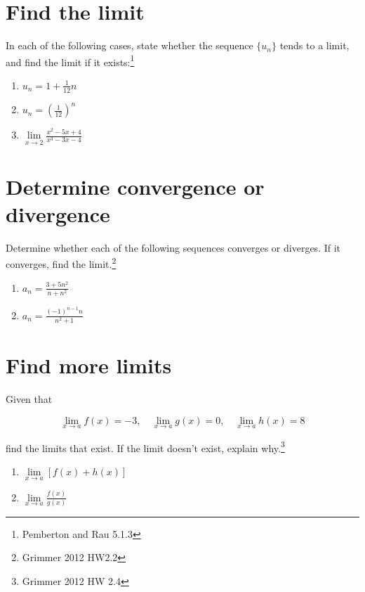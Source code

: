 \documentclass[
  letterpaper,
  DIV=11,
  numbers=noendperiod]{scrartcl}
\begin{document}
\hypertarget{find-the-limit}{%
\section{Find the limit}\label{find-the-limit}}

In each of the following cases, state whether the sequence \(\{ u_n \}\)
tends to a limit, and find the limit if it exists:\footnote{Pemberton
  and Rau 5.1.3}

\begin{enumerate}
\def\labelenumi{\alph{enumi}.}
\item
  \(u_n = 1 + \frac{1}{12} n\)
\item
  \(u_n = \left( \frac{1}{12} \right)^n\)
\item
  \(\underset{x \to 2}\lim \frac{x^2 - 5x + 4}{x^3 - 3x -4}\)
\end{enumerate}

\hypertarget{determine-convergence-or-divergence}{%
\section{Determine convergence or
divergence}\label{determine-convergence-or-divergence}}

Determine whether each of the following sequences converges or diverges.
If it converges, find the limit.\footnote{Grimmer 2012 HW2.2}

\begin{enumerate}
\def\labelenumi{\alph{enumi}.}
\item
  \(a_n = \frac{3 + 5n^2}{n + n^2}\)
\item
  \(a_n = \frac{(-1)^{n-1} n}{n^2 + 1}\)
\end{enumerate}

\hypertarget{find-more-limits}{%
\section{Find more limits}\label{find-more-limits}}

Given that

\[
\underset{x \to a} \lim f(x) = -3, \quad \underset{x \to a} \lim g(x) = 0 , \quad \underset{x \to a} \lim h(x) = 8
\]

find the limits that exist. If the limit doesn't exist, explain
why.\footnote{Grimmer 2012 HW 2.4}

\begin{enumerate}
\def\labelenumi{\alph{enumi}.}
\item
  \(\underset{x \to a} \lim [f(x) + h(x)]\)
\item
  \(\underset{x \to a} \lim \frac{f(x)}{g(x)}\)
\end{enumerate}
\end{document}
